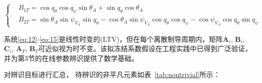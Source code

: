\begin{equation}
\label{eq:15}
\left\{
\begin{aligned}
& {B_{1T}} = \cos {q_\theta }\cos {q_\psi }\sin {\theta _A} + \sin {q_\theta }\cos {\theta _A} \\
& {B_{2T}} = \sin {\theta _A}\sin {\psi _{{V_A}}}\sin {q_\theta } - \cos {\theta _A}\sin {\psi _{{V_A}}}\cos {q_\theta }\cos {q_\psi } - \cos {\psi _{{V_A}}}\cos {q_\theta }\sin {q_\psi }
\end{aligned}
\right.
\end{equation}
\begin{remark}
系统\eqref{eq:12}-\eqref{eq:15}是线性时变的(LTV)，但在每个离散制导周期内，矩阵${{\mathbf{A}}_i}$, ${{\mathbf{B}}_i}$, ${{\mathbf{C}}_i}$, ${{\mathbf{A}}_T}$, ${{\mathbf{B}}_T}$可近似视为时不变。该拟冻结系数假设在工程实践中已得到广泛验证，并为第3节的在线参数辨识提供了数学基础。
\end{remark}
对辨识目标进行汇总， 待辨识的非平凡元素如表~\ref{tab:nontrivial}所示：

